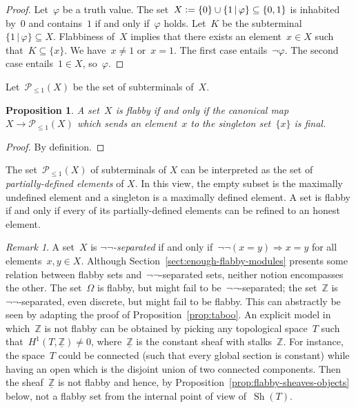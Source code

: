 \documentclass[oneside]{amsart}
\theoremstyle{definition}
\theoremstyle{plain}
\newtheorem{prop}[defn]{Proposition}
\theoremstyle{remark}
\newtheorem{rem}[defn]{Remark}
\newcommand{\ZZ}{\mathbb{Z}}
\renewcommand{\P}{\mathcal{P}}
\newcommand{\defeq}{\vcentcolon=}
\DeclareMathOperator{\Sh}{Sh}
\renewcommand{\_}{\mathpunct{.}\,}
\begin{document}
\begin{proof}Let~$\varphi$ be a truth value. The set~$X \defeq \{ 0 \}
\cup \{ 1 \,|\, \varphi \} \subseteq \{ 0,1 \}$ is inhabited by~$0$ and
contains~$1$ if and only if~$\varphi$ holds. Let~$K$ be the subterminal~$\{ 1 \,|\, \varphi
\} \subseteq X$. Flabbiness of~$X$ implies that there exists an element~$x \in
X$ such that~$K \subseteq \{x\}$. We have~$x \neq 1$ or~$x = 1$. The first case
entails~$\neg\varphi$. The second case entails~$1 \in X$, so~$\varphi$.
\end{proof}

Let~$\P_{\leq 1}(X)$ be the set of subterminals of~$X$.

\begin{prop}A set~$X$ is flabby if and only if the canonical map~$X \to
\P_{\leq 1}(X)$ which sends an element~$x$ to the singleton set~$\{x\}$ is
final.
\end{prop}

\begin{proof}By definition.\end{proof}

The set~$\P_{\leq 1}(X)$ of subterminals of $X$ can be interpreted as the set
of \emph{partially-defined elements} of $X$. In this view, the empty subset is
the maximally undefined element and a singleton is a maximally defined element.
A set is flabby if and only if every of its partially-defined elements can be
refined to an honest element.

\begin{rem}\label{rem:constant-flabby}
A set~$X$ is \emph{$\neg\neg$-separated} if and only
if~$\neg\neg(x=y)\Rightarrow x=y$ for all elements~$x,y \in X$.
Although Section~\ref{sect:enough-flabby-modules} presents some
relation between flabby sets and~$\neg\neg$-separated sets, neither notion
encompasses the other. The set~$\Omega$ is flabby, but might fail to
be~$\neg\neg$-separated; the set~$\ZZ$ is~$\neg\neg$-separated, even discrete,
but might fail to be flabby. This can abstractly be seen by adapting the proof of
Proposition~\ref{prop:taboo}. An explicit model in which~$\ZZ$ is not flabby
can be obtained by picking any topological space~$T$ such that~$H^1(T,
\underline{\ZZ}) \neq 0$, where~$\underline{\ZZ}$ is the constant sheaf with
stalks~$\ZZ$. For instance, the space~$T$ could be connected (such that every
global section is constant) while having an open which is the disjoint union of
two connected components. Then the sheaf~$\underline{\ZZ}$ is not
flabby and hence, by Proposition~\ref{prop:flabby-sheaves-objects} below, not a
flabby set from the internal point of view of~$\Sh(T)$.
\end{rem}
\end{document}
